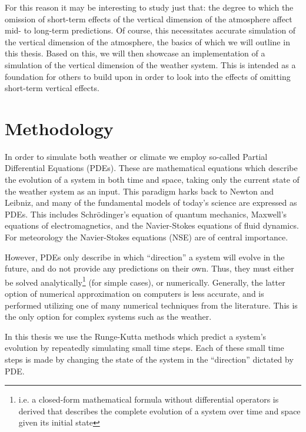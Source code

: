 For this reason it may be interesting to study just that: the degree to which the omission of short-term effects of the vertical dimension of the atmosphere affect mid- to long-term predictions.
Of course, this necessitates accurate simulation of the vertical dimension of the atmosphere, the basics of which we will outline in this thesis.
Based on this, we will then showcase an implementation of a simulation of the vertical dimension of the weather system.
This is intended as a foundation for others to build upon in order to look into the effects of omitting short-term vertical effects.

\section{Methodology}
In order to simulate both weather or climate we employ so-called Partial Differential Equations (PDEs).
These are mathematical equations which describe the evolution of a system in both time and space, taking only the current state of the weather system as an input.
This paradigm harks back to Newton and Leibniz, and many of the fundamental models of today's science are expressed as PDEs.
This includes Schr\"odinger's equation of quantum mechanics, Maxwell's equations of electromagnetics, and the Navier-Stokes equations of fluid dynamics.
For meteorology the Navier-Stokes equations (NSE) are of central importance.

However, PDEs only describe in which ``direction'' a system will evolve in the future, and do not provide any predictions on their own.
Thus, they must either be solved analytically\footnote{i.e. a closed-form mathematical formula without differential operators is derived that describes the complete evolution of a system over time and space given its initial state} (for simple cases), or numerically.
Generally, the latter option of numerical approximation on computers is less accurate, and is performed utilizing one of many numerical techniques from the literature.
This is the only option for complex systems such as the weather.

In this thesis we use the Runge-Kutta methods which predict a system's evolution by repeatedly simulating small time steps.
Each of these small time steps is made by changing the state of the system in the ``direction'' dictated by PDE.
\\


